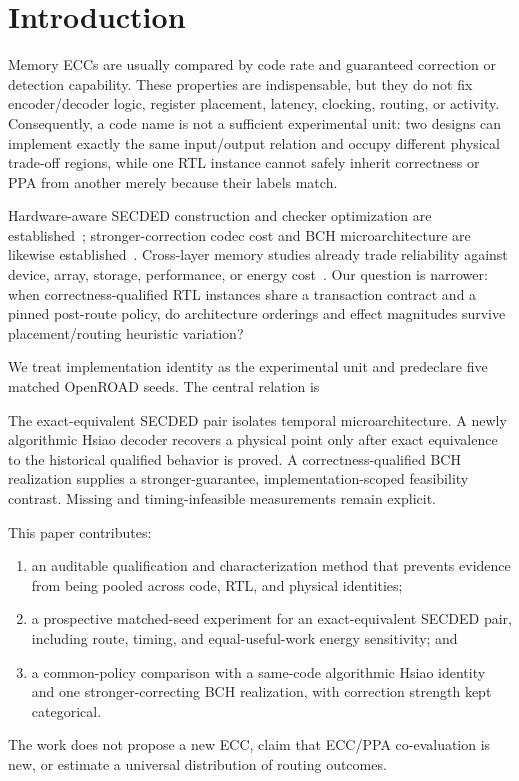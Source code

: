 \section{Introduction}

Memory ECCs are usually compared by code rate and guaranteed correction or detection capability. These properties are indispensable, but they do not fix encoder/decoder logic, register placement, latency, clocking, routing, or activity. Consequently, a code name is not a sufficient experimental unit: two designs can implement exactly the same input/output relation and occupy different physical trade-off regions, while one RTL instance cannot safely inherit correctness or PPA from another merely because their labels match.

Hardware-aware SECDED construction and checker optimization are established~\cite{hsiao1970,ghosh2004,reviriego2013}; stronger-correction codec cost and BCH microarchitecture are likewise established~\cite{naseer2008,wong2011,das2019,lagendijk2026}. Cross-layer memory studies already trade reliability against device, array, storage, performance, or energy cost~\cite{delbel2014,pajouhi2015,wei2020,lee2022}. Our question is narrower: when correctness-qualified RTL instances share a transaction contract and a pinned post-route policy, do architecture orderings and effect magnitudes survive placement/routing heuristic variation?

We treat implementation identity as the experimental unit and predeclare five matched OpenROAD seeds. The central relation is
\begin{center}
\end{center}
The exact-equivalent SECDED pair isolates temporal microarchitecture. A newly algorithmic Hsiao decoder recovers a physical point only after exact equivalence to the historical qualified behavior is proved. A correctness-qualified BCH realization supplies a stronger-guarantee, implementation-scoped feasibility contrast. Missing and timing-infeasible measurements remain explicit.

This paper contributes:
\begin{enumerate}
\item an auditable qualification and characterization method that prevents evidence from being pooled across code, RTL, and physical identities;
\item a prospective matched-seed experiment for an exact-equivalent SECDED pair, including route, timing, and equal-useful-work energy sensitivity; and
\item a common-policy comparison with a same-code algorithmic Hsiao identity and one stronger-correcting BCH realization, with correction strength kept categorical.
\end{enumerate}
The work does not propose a new ECC, claim that ECC/PPA co-evaluation is new, or estimate a universal distribution of routing outcomes.
